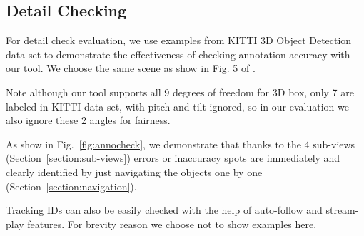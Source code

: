 \documentclass[letterpaper, 10 pt, conference]{ieeeconf}  %
\begin{document}
\subsection{Detail Checking}
For detail check evaluation, we use examples from KITTI 3D Object Detection data \cite{Geiger2012CVPR} set to demonstrate the effectiveness of checking annotation accuracy with our tool. We choose the same scene as show in  Fig. 5 of \cite{pointatme}.

Note although our tool supports all 9 degrees of freedom for 3D box, only 7 are labeled in KITTI data set, with pitch and tilt ignored, so in our evaluation we also ignore these 2 angles for fairness.

As show in Fig.~\ref{fig:annocheck}, we demonstrate that thanks to the 4 sub-views (Section~\ref{section:sub-views}) errors or inaccuracy spots are immediately and clearly identified by just navigating the objects one by one (Section~\ref{section:navigation}).

Tracking IDs can also be easily checked with the help of auto-follow  and stream-play features. For brevity reason we choose not to show examples here.
\end{document}
